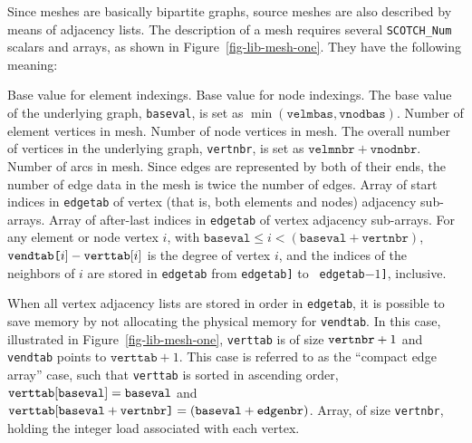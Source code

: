 Since meshes are basically bipartite graphs, source meshes are also
described by means of adjacency lists. The description of a mesh
requires several {\tt SCOTCH\_Num} scalars and arrays, as shown in
Figure~\ref{fig-lib-mesh-one}. They have the following meaning:
\begin{itemize}
\iteme[{\tt velmbas}]
Base value for element indexings.
\iteme[{\tt vnodbas}]
Base value for node indexings. The base value of the underlying graph,
{\tt baseval}, is set as $\min(\mathtt{velmbas}, \mathtt{vnodbas})$.
\iteme[{\tt velmnbr}]
Number of element vertices in mesh.
\iteme[{\tt vnodnbr}]
Number of node vertices in mesh.
The overall number of vertices in the underlying graph, {\tt vertnbr},
is set as $\mathtt{velmnbr} +\mathtt{vnodnbr}$.
\iteme[{\tt edgenbr}]
Number of arcs in mesh. Since edges are represented by both of their
ends, the number of edge data in the mesh is twice the number of
edges.
\iteme[{\tt verttab}]
Array of start indices in {\tt edgetab} of vertex (that is, both
elements and nodes) adjacency sub-arrays.
\iteme[{\tt vendtab}]
Array of after-last indices in {\tt edgetab} of vertex adjacency
sub-arrays. For any element or node vertex $i$, with
$\mathtt{baseval} \leq i <
(\mathtt{baseval} + \mathtt{vertnbr})$, $\mbox{\tt
vendtab[}i\mathtt{]} - \mathtt{verttab[}i\mathtt{]}$ is the
degree of vertex $i$, and the indices of the neighbors of $i$ are
stored in {\tt edgetab} from {\tt edgetab\lbt [verttab[$i$]]} to {\tt
edgetab\lbt [vendtab[$i$]\lbt $- 1$]}, inclusive.

When all vertex adjacency lists are stored in order in {\tt edgetab},
it is possible to save memory by not allocating the physical memory
for {\tt vendtab}. In this case, illustrated in
Figure~\ref{fig-lib-mesh-one}, {\tt verttab} is of size $\mbox{\tt
vertnbr} + 1$ and {\tt vendtab} points to $\mathtt{verttab} + 1$.
This case is referred to as the ``compact edge array'' case, such that
{\tt verttab} is sorted in ascending order,
$\mathtt{verttab[}\lbt\mathtt{baseval]} = \mathtt{baseval}$
and $\mathtt{verttab[}\lbt\mathtt{baseval} + \mbox{\tt
vertnbr]} = (\mathtt{baseval} + \mathtt{edgenbr})$.
\iteme[{\tt velotab}]
Array, of size {\tt vertnbr}, holding the integer load associated with
each vertex.
\end{itemize}


